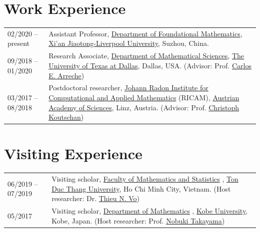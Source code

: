 \documentclass[a4paper,12pt]{article}
\begin{document}
\section*{\Large{Work Experience}}
\begin{tabular}{@{}p{1.4in}p{4in}}
02/2020 --   present              & Assistant Professor, \href{https://www.xjtlu.edu.cn/en/study/departments/academic-departments/foundational-mathematics/}{Department of Foundational Mathematics}, \href{https://www.xjtlu.edu.cn/en/}{Xi'an Jiaotong-Liverpool University}, Suzhou, China. \\
09/2018 -- 01/2020    & Research Associate, \href{https://www.utdallas.edu/math/}{Department of Mathematical Sciences}, 
                        \href{https://www.utdallas.edu/}{The University of Texas at Dallas}, Dallas, USA. 
                        (Advisor: Prof. \href{https://www.utdallas.edu/~arreche/}{Carlos E. Arreche}) \\    
03/2017 -- 08/2018    & Postdoctoral researcher, 
                        \href{https://www.ricam.oeaw.ac.at/}{Johann Radon Institute for Computational and Applied Mathematics} (RICAM),
                        \href{http://www.oeaw.ac.at/en/austrian-academy-of-sciences/}{Austrian Academy of Sciences}, Linz, Austria. 
                        (Advisor: Prof. \href{http://www.koutschan.de/}{Christoph Koutschan})\\
\end{tabular}

\section*{\Large{Visiting Experience}}
\begin{tabular}{@{}p{1.4in}p{4in}}
06/2019 -- 07/2019               & Visiting scholar, 
                        \href{https://fms.tdtu.edu.vn/}{Faculty of Mathematics and Statistics} ,
                        \href{https://tdtu.edu.vn/}{Ton Duc Thang University}, Ho Chi Minh City, Vietnam. 
                        (Host researcher: Dr. \href{https://sites.google.com/tdtu.edu.vn/vongocthieu}{Thieu N. Vo})\\
05/2017               & Visiting scholar, 
                        \href{http://www.math.kobe-u.ac.jp/}{Department of Mathematics} ,
                        \href{http://www.kobe-u.ac.jp/en/}{Kobe University}, Kobe, Japan. 
                        (Host researcher: Prof. \href{http://www.math.kobe-u.ac.jp/home-j/takayama-e.html}{Nobuki Takayama})\\
\end{tabular}
\end{document}
